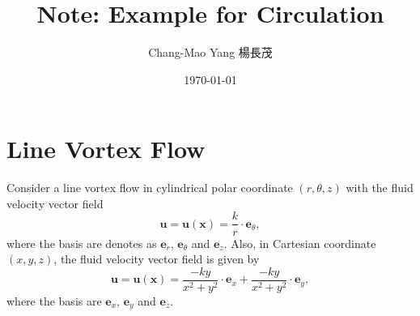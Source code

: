 \documentclass[12pt]{article}
\title{Note: Example for Circulation}
\date{\today}
\author{Chang-Mao Yang 楊長茂}
\begin{document}
\maketitle

\section{Line Vortex Flow}
Consider a line vortex flow in cylindrical polar coordinate $\left(r, \theta, z\right)$ with the fluid velocity vector field 
\begin{equation}
\textbf{u}
= \textbf{u}\left(\textbf{x}\right)
= \frac{k}{r} \cdot \textbf{e}_\theta,
\end{equation}
where the basis are denotes as $\textbf{e}_r$, $\textbf{e}_\theta$ and $\textbf{e}_z$. Also, in Cartesian coordinate $\left(x,y,z\right)$, the fluid velocity vector field is given by
\begin{equation}
\textbf{u}
= \textbf{u}\left(\textbf{x}\right)
= \frac{-ky}{x^2 + y^2} \cdot \textbf{e}_x + \frac{-ky}{x^2 + y^2} \cdot \textbf{e}_y,
\end{equation}
where the basis are $\textbf{e}_x$, $\textbf{e}_y$ and $\textbf{e}_z$.

\noindent{}
\end{document}

